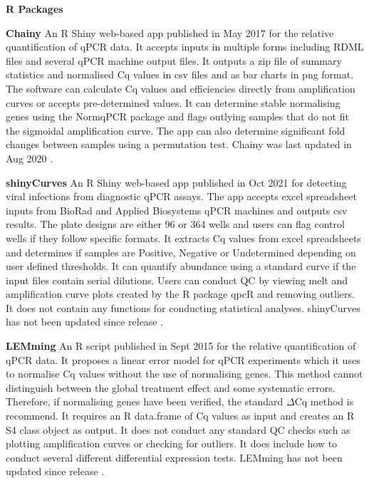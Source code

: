 \documentclass{SBCbookchapter}
\begin{document}
\textbf{R Packages}

\textbf{Chainy} An R Shiny web-based app published in May 2017 for the relative quantification of qPCR data. It accepts inputs in multiple forms including RDML files and several qPCR machine output files. It outputs a zip file of summary statistics and normalised Cq values in csv files and as bar charts in png format. The software can calculate Cq values and efficiencies directly from amplification curves or accepts pre-determined values. It can determine stable normalising genes using the NormqPCR package and flags outlying samples that do not fit the sigmoidal amplification curve. The app can also determine significant fold changes between samples using a permutation test. Chainy was last updated in Aug 2020 \cite{Mallona2017}.

\textbf{shinyCurves} An R Shiny web-based app published in Oct 2021 for detecting viral infections from diagnostic qPCR assays. The app accepts excel spreadsheet inputs from BioRad and Applied Biosystems qPCR machines and outputs csv results. The plate designs are either 96 or 364 wells and users can flag control wells if they follow specific formats. It extracts Cq values from excel spreadsheets and determines if samples are Positive, Negative or Undetermined depending on user defined thresholds. It can quantify abundance using a standard curve if the input files contain serial dilutions. Users can conduct QC by viewing melt and amplification curve plots created by the R package qpcR and removing outliers.  It does not contain any functions for conducting statistical analyses. shinyCurves has not been updated since release \cite{OlaecheaLazaro2021}.

\textbf{LEMming} An R script published in Sept 2015 for the relative quantification of qPCR data. It proposes a linear error model for qPCR experiments which it uses to normalise Cq values without the use of normalising genes. This method cannot distinguish between the global treatment effect and some systematic errors. Therefore, if normalising genes have been verified, the standard $\Delta$Cq method is recommend. It requires an R data.frame of Cq values as input and creates an R S4 class object as output. It does not conduct any standard QC checks such as plotting amplification curves or checking for outliers.  It does include how to conduct several different differential expression tests. LEMming has not been updated since release \cite{Feuer2015}.
\end{document}
